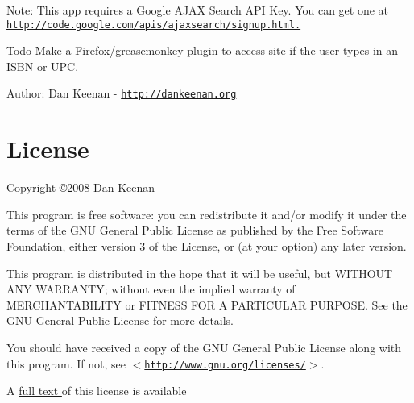 \begin{Desc}
\item[Note:]This app requires a Google AJAX Search API Key. You can get one at \href{http://code.google.com/apis/ajaxsearch/signup.html.}{\tt http://code.google.com/apis/ajaxsearch/signup.html.}\end{Desc}
\begin{Desc}
\item[\hyperlink{todo__todo000001}{Todo}]Make a Firefox/greasemonkey plugin to access site if the user types in an ISBN or UPC.\end{Desc}
\begin{Desc}
\item[Author:]Dan Keenan - \href{http://dankeenan.org}{\tt http://dankeenan.org} \end{Desc}
\hypertarget{index_license}{}\section{License}\label{index_license}
Copyright \copyright 2008 Dan Keenan

This program is free software: you can redistribute it and/or modify it under the terms of the GNU General Public License as published by the Free Software Foundation, either version 3 of the License, or (at your option) any later version.

This program is distributed in the hope that it will be useful, but WITHOUT ANY WARRANTY; without even the implied warranty of MERCHANTABILITY or FITNESS FOR A PARTICULAR PURPOSE. See the GNU General Public License for more details.

You should have received a copy of the GNU General Public License along with this program. If not, see $<$\href{http://www.gnu.org/licenses/}{\tt http://www.gnu.org/licenses/}$>$.



A \hyperlink{license}{full text } of this license is available 
